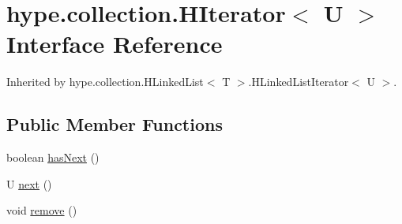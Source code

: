 \hypertarget{interfacehype_1_1collection_1_1_h_iterator_3_01_u_01_4}{\section{hype.\-collection.\-H\-Iterator$<$ U $>$ Interface Reference}
\label{interfacehype_1_1collection_1_1_h_iterator_3_01_u_01_4}
}


Inherited by hype.\-collection.\-H\-Linked\-List$<$ T $>$.\-H\-Linked\-List\-Iterator$<$ U $>$.

\subsection*{Public Member Functions}
\begin{DoxyCompactItemize}
\item 
boolean \hyperlink{interfacehype_1_1collection_1_1_h_iterator_3_01_u_01_4_a9bb4b33c5cd01aa182a7bcf765c0c632}{has\-Next} ()
\item 
U \hyperlink{interfacehype_1_1collection_1_1_h_iterator_3_01_u_01_4_a8bc0593ff91057153822cdc9e368e62d}{next} ()
\item 
void \hyperlink{interfacehype_1_1collection_1_1_h_iterator_3_01_u_01_4_a0d36232a70330edc753db8d43e57a91c}{remove} ()
\end{DoxyCompactItemize}


